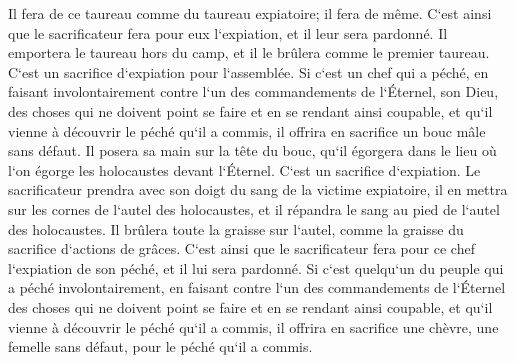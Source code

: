 \verse Il fera de ce taureau comme du taureau expiatoire; il fera de même. C`est ainsi que le sacrificateur fera pour eux l`expiation, et il leur sera pardonné. 
\verse Il emportera le taureau hors du camp, et il le brûlera comme le premier taureau. C`est un sacrifice d`expiation pour l`assemblée. 
\verse Si c`est un chef qui a péché, en faisant involontairement contre l`un des commandements de l`Éternel, son Dieu, des choses qui ne doivent point se faire et en se rendant ainsi coupable, 
\verse et qu`il vienne à découvrir le péché qu`il a commis, il offrira en sacrifice un bouc mâle sans défaut. 
\verse Il posera sa main sur la tête du bouc, qu`il égorgera dans le lieu où l`on égorge les holocaustes devant l`Éternel. C`est un sacrifice d`expiation. 
\verse Le sacrificateur prendra avec son doigt du sang de la victime expiatoire, il en mettra sur les cornes de l`autel des holocaustes, et il répandra le sang au pied de l`autel des holocaustes. 
\verse Il brûlera toute la graisse sur l`autel, comme la graisse du sacrifice d`actions de grâces. C`est ainsi que le sacrificateur fera pour ce chef l`expiation de son péché, et il lui sera pardonné. 
\verse Si c`est quelqu`un du peuple qui a péché involontairement, en faisant contre l`un des commandements de l`Éternel des choses qui ne doivent point se faire et en se rendant ainsi coupable, 
\verse et qu`il vienne à découvrir le péché qu`il a commis, il offrira en sacrifice une chèvre, une femelle sans défaut, pour le péché qu`il a commis. 
